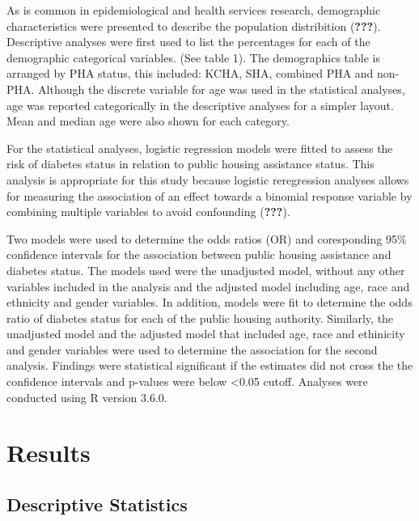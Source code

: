 \documentclass [11pt, proquest] {uwthesis}[2015/03/03]
\begin{document}
As is common in epidemiological and health services research,
demographic characteristics were presented to describe the population
distribition ({\textbf{???}}). Descriptive analyses were first used to
list the percentages for each of the demographic categorical variables.
(See table 1). The demographics table is arranged by PHA status, this
included: KCHA, SHA, combined PHA and non-PHA. Although the discrete
variable for age was used in the statistical analyses, age was reported
categorically in the descriptive analyses for a simpler layout. Mean and
median age were also shown for each category.

For the statistical analyses, logistic regression models were fitted to
assess the risk of diabetes status in relation to public housing
assistance status. This analysis is appropriate for this study because
logistic reregression analyses allows for measuring the association of
an effect towards a binomial response variable by combining multiple
variables to avoid confounding ({\textbf{???}}).

Two models were used to determine the odds ratios (OR) and coresponding
95\% confidence intervals for the association between public housing
assistance and diabetes status. The models used were the unadjusted
model, without any other variables included in the analysis and the
adjusted model including age, race and ethnicity and gender variables.
In addition, models were fit to determine the odds ratio of diabetes
status for each of the public housing authority. Similarly, the
unadjusted model and the adjusted model that included age, race and
ethinicity and gender variables were used to determine the association
for the second analysis. Findings were statistical significant if the
estimates did not cross the the confidence intervals and p-values were
below \textless{}0.05 cutoff. Analyses were conducted using R version
3.6.0.

\chapter{Results}\label{ref-labels}

\section{Descriptive Statistics}\label{descriptive-statistics}
\end{document}
